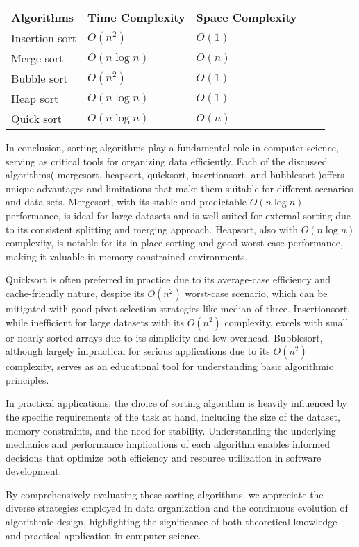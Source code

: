 \documentclass[sigplan,screen]{acmart}
\begin{document}
\begin{table}[H]
  \begin{tabular}{@{}lllll@{}}
  \toprule
  Algorithms & Time Complexity         & Space Complexity \\ \midrule
  Insertion sort     & $O(n^2)$             &$O(1)$ \\
  Merge sort         & $O(n \log n)$        & $O(n)$ \\
  Bubble sort        & $O(n^2)$             & $O(1)$ \\
  Heap sort          & $O(n \log n)$        & $O(1)$ \\
  Quick sort         & $O(n \log n)$        & $O(n)$ \\ \bottomrule
  \end{tabular}
  \end{table}

  In conclusion, sorting algorithms play a fundamental role in computer science, 
  serving as critical tools for organizing data efficiently. 
  Each of the discussed algorithms( mergesort, heapsort, quicksort, 
  insertionsort, and bubblesort )offers unique advantages and limitations 
  that make them suitable for different scenarios and data sets.
  \newline
  Mergesort, with its stable and predictable $O(n \log n)$ performance, 
  is ideal for large datasets and is well-suited for external sorting due 
  to its consistent splitting and merging approach. Heapsort, also with $O(n \log n)$ 
  complexity, is notable for its in-place sorting and good worst-case performance, 
  making it valuable in memory-constrained environments.
  
  Quicksort is often preferred in practice due to its average-case 
  efficiency and cache-friendly nature, despite its $O(n^2)$ worst-case 
  scenario, which can be mitigated with good pivot selection strategies 
  like median-of-three. Insertionsort, while inefficient for large datasets 
  with its $O(n^2)$ complexity, excels with small or nearly sorted arrays due 
  to its simplicity and low overhead. 
  Bubblesort, although largely impractical for serious applications due to its 
  $O(n^2)$ complexity, serves as an educational tool for understanding basic 
  algorithmic principles.
  
  In practical applications, the choice of sorting algorithm is heavily influenced 
  by the specific requirements of the task at hand, including the size of the dataset, 
  memory constraints, and the need for stability. Understanding the underlying mechanics 
  and performance implications of each algorithm enables informed decisions that optimize 
  both efficiency and resource utilization in software development.
  
  By comprehensively evaluating these sorting algorithms, we appreciate 
  the diverse strategies employed in data organization and the continuous 
  evolution of algorithmic design, highlighting the significance of both 
  theoretical knowledge and practical application in computer science.


\end{document}
